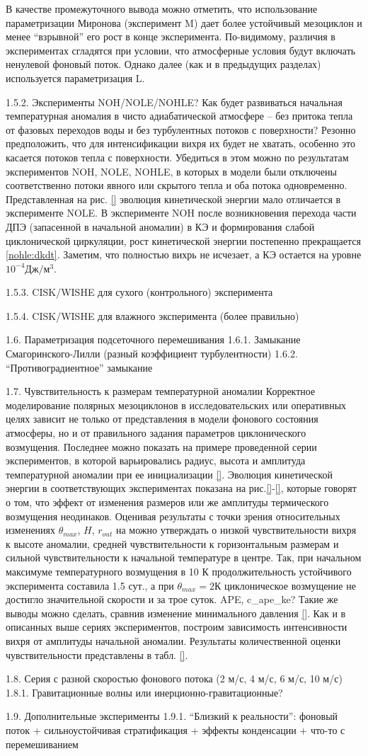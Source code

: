В качестве промежуточного вывода можно отметить, что использование параметризации Миронова (эксперимент M) дает более устойчивый мезоциклон и менее “взрывной” его рост в конце эксперимента. По-видимому, различия в экспериментах сгладятся при условии, что атмосферные условия будут включать ненулевой фоновый поток. Однако далее (как и в предыдущих разделах) используется параметризация L.

1.5.2.	Эксперименты NOH/NOLE/NOHLE?
Как будет развиваться начальная температурная аномалия в чисто адиабатической атмосфере – без притока тепла от фазовых переходов воды и без турбулентных потоков с поверхности? Резонно предположить, что для интенсификации вихря их будет не хватать, особенно это касается потоков тепла с поверхности. Убедиться в этом можно по результатам экспериментов NOH, NOLE, NOHLE, в которых в модели были отключены соответственно потоки явного или скрытого тепла и оба потока одновременно. Представленная на рис. \ref{} эволюция кинетической энергии мало отличается в эксперименте NOLE. В эксперименте NOH после возникновения перехода части ДПЭ (запасенной в начальной аномалии) в КЭ и формирования слабой циклонической циркуляции, рост кинетической энергии постепенно прекращается \ref{nohle:dkdt}. Заметим, что полностью вихрь не исчезает, а КЭ остается на уровне $10^{-4} Дж/м^{3}$. 

1.5.3.	CISK/WISHE для сухого (контрольного) эксперимента


1.5.4.	CISK/WISHE для влажного эксперимента (более правильно)

1.6.	Параметризация подсеточного перемешивания
1.6.1.	Замыкание Смагоринского-Лилли (разный коэффициент турбулентности) 
1.6.2.	“Противоградиентное” замыкание

1.7.	Чувствительность к размерам температурной аномалии
Корректное моделирование полярных мезоциклонов в исследовательских или оперативных целях зависит не только от представления в модели фонового состояния атмосферы, но и от правильного задания параметров циклонического возмущения. Последнее можно показать на примере проведенной серии экспериментов, в которой варьировались радиус, высота и амплитуда температурной аномалии при ее инициализации \ref{}. Эволюция кинетической энергии в соответствующих экспериментах показана на рис.\ref{}-\ref{}, которые говорят о том, что эффект от изменения размеров или же амплитуды термического возмущения неодинаков. Оценивая результаты с точки зрения относительных изменениях $\theta_{max}$, $H$, $r_{out}$ на можно утверждать о низкой чувствительности вихря к высоте аномалии, средней чувствительности к горизонтальным размерам и сильной чувствительности к начальной температуре в центре. Так, при начальном максимуме температурного возмущения в 10 К продолжительность устойчивого эксперимента составила 1.5 сут., а при $\theta_{max}=2 К$ циклоническое возмущение не достигло значительной скорости и за трое суток.
APE, c_ape_ke?
Такие же выводы можно сделать, сравнив изменение минимального давления \ref{}. Как и в описанных выше сериях экспериментов, построим зависимость интенсивности вихря от амплитуды начальной аномалии. Результаты количественной оценки чувствительности представлены в табл. \ref{}. 

1.8.	Серия с разной скоростью фонового потока (2 м/с, 4 м/с, 6 м/с, 10 м/с)
1.8.1.	Гравитационные волны или инерционно-гравитационные?


1.9.	Дополнительные эксперименты
1.9.1.	“Близкий к реальности”: фоновый поток + сильноустойчивая стратификация + эффекты конденсации + что-то с перемешиванием


